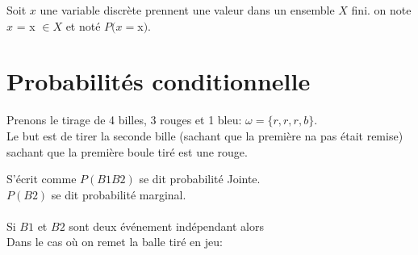 Soit $x$ une variable discrète prennent une valeur dans un ensemble $X$ fini.
on note $x$ = x $\in X$ et noté $P(x=$x$)$.


\section{Probabilités conditionnelle}
Prenons le tirage de 4 billes, 3 rouges et 1 bleu: $\omega = \{r,r,r,b\}$.\\
Le but est de tirer la seconde bille (sachant que la première na pas était remise) sachant que la première boule tiré est une rouge.\\


S'écrit comme
$P(B1 B2)$ se dit probabilité Jointe.\\
$P(B2)$ se dit probabilité marginal.\\
\\
Si $B1$ et $B2$ sont deux événement indépendant alors 
\ \\
Dans le cas où on remet la balle tiré en jeu:
\pagebreak


